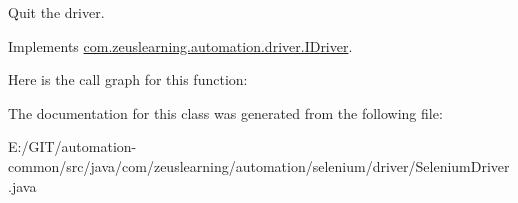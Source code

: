 Quit the driver. 

Implements \hyperlink{interfacecom_1_1zeuslearning_1_1automation_1_1driver_1_1IDriver_abf28b69bbf3db2e4f4727c3498ccde0f}{com.\+zeuslearning.\+automation.\+driver.\+I\+Driver}.

Here is the call graph for this function\+:


The documentation for this class was generated from the following file\+:\begin{DoxyCompactItemize}
\item 
E\+:/\+G\+I\+T/automation-\/common/src/java/com/zeuslearning/automation/selenium/driver/Selenium\+Driver.\+java\end{DoxyCompactItemize}
